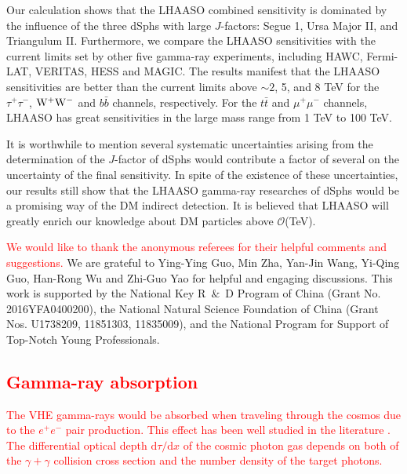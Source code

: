 \documentclass[12pt,aps,prd,amsmath,amssymb,showpacs,floats,floatfix,nofootinbib]{revtex4-1}
\def\red#1{{\textcolor{red}{#1}}} %
\begin{document}
Our calculation shows that the LHAASO combined sensitivity is dominated by the influence of the three dSphs with large $J$-factors: Segue 1, Ursa Major II, and Triangulum II. Furthermore, we compare the LHAASO sensitivities with the current limits set by other five gamma-ray experiments, including HAWC, Fermi-LAT, VERITAS, HESS and MAGIC.
The results manifest that the LHAASO sensitivities are better than the current limits above $\sim2$, 5, and 8 TeV for the $\tau^+\tau^-$, $\rm W^+W^-$ and $b\bar{b}$ channels, respectively. For the $t\bar{t}$ and $\mu^{+}\mu^{-}$ channels, LHAASO has great sensitivities in the large mass range from 1 TeV to 100 TeV.


It is worthwhile to mention several systematic uncertainties arising from the determination of the $J$-factor of dSphs would contribute a factor of several on the uncertainty of the final sensitivity.
In spite of the existence of these uncertainties, our results still show that the LHAASO gamma-ray researches of dSphs would be a promising way of the DM indirect detection. It is believed that LHAASO will greatly enrich our knowledge about DM particles above ${\mathcal O}$(TeV).

\begin{acknowledgments}
\red{We would like to thank the anonymous referees for their helpful comments and suggestions.}  
We are grateful to Ying-Ying Guo, Min Zha, Yan-Jin Wang, Yi-Qing Guo, Han-Rong Wu and Zhi-Guo Yao for helpful and engaging discussions.
This work is supported by the National Key R~$\&$~D Program of China (Grant No. 2016YFA0400200), the National Natural Science Foundation of China (Grant Nos. U1738209, 11851303, 11835009), and the National Program for Support of Top-Notch Young Professionals.
\end{acknowledgments}

\appendix
\red{
\section{Gamma-ray absorption} \label{gamma_absorption}
The VHE gamma-rays would be absorbed when traveling through the cosmos due to the $e^+e^-$ pair production.
This effect has been well studied in the literature \cite{Franceschini:2008tp,Gould:1967zzb}.
The differential optical depth $\mathrm{d}\tau/\mathrm{d}x$ of the cosmic photon gas depends on both of the $\gamma+\gamma$ collision cross section and the number density of the target photons.
}
\end{document}
